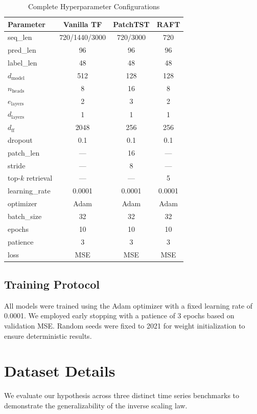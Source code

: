 \documentclass{article} %
\begin{document}
\begin{table}[h]
\centering
\caption{Complete Hyperparameter Configurations}
\label{tab:hyperparams}
\small
\begin{tabular}{lccc}
\toprule
\textbf{Parameter} & \textbf{Vanilla TF} & \textbf{PatchTST} & \textbf{RAFT} \\
\midrule
seq\_len & 720/1440/3000 & 720/3000 & 720 \\
pred\_len & 96 & 96 & 96 \\
label\_len & 48 & 48 & 48 \\
$d_{\text{model}}$ & 512 & 128 & 128 \\
$n_{\text{heads}}$ & 8 & 16 & 8 \\
$e_{\text{layers}}$ & 2 & 3 & 2 \\
$d_{\text{layers}}$ & 1 & 1 & 1 \\
$d_{\text{ff}}$ & 2048 & 256 & 256 \\
dropout & 0.1 & 0.1 & 0.1 \\
patch\_len & --- & 16 & --- \\
stride & --- & 8 & --- \\
top-$k$ retrieval & --- & --- & 5 \\
\midrule
learning\_rate & 0.0001 & 0.0001 & 0.0001 \\
optimizer & Adam & Adam & Adam \\
batch\_size & 32 & 32 & 32 \\
epochs & 10 & 10 & 10 \\
patience & 3 & 3 & 3 \\
loss & MSE & MSE & MSE \\
\bottomrule
\end{tabular}
\end{table}

\subsection{Training Protocol}

All models were trained using the Adam optimizer with a fixed learning rate of 0.0001. We employed early stopping with a patience of 3 epochs based on validation MSE. Random seeds were fixed to 2021 for weight initialization to ensure deterministic results.

\section{Dataset Details}

We evaluate our hypothesis across three distinct time series benchmarks to demonstrate the generalizability of the inverse scaling law.
\end{document}
